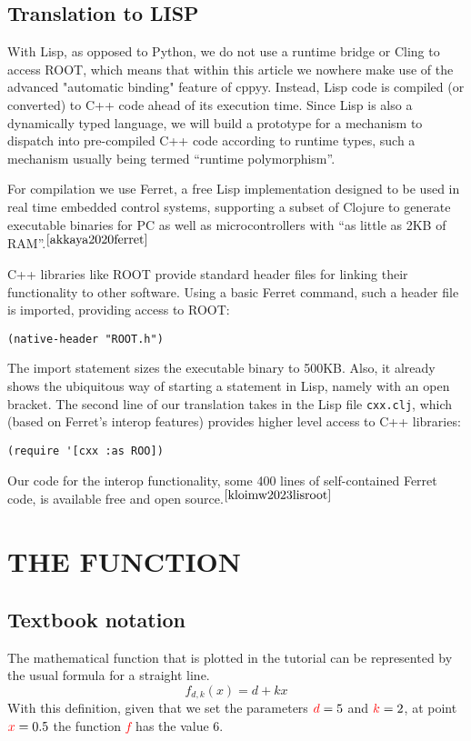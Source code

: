 \documentclass[twocolumn]{article}
\begin{document}
\subsection{Translation to LISP}
With Lisp, as opposed to Python, we do not use a runtime bridge or Cling to access ROOT, which means that within this article we nowhere make use of the advanced "automatic binding" feature of cppyy. Instead, Lisp code is compiled (or converted) to C++ code ahead of its execution time. Since Lisp is also a dynamically typed language, we will build a prototype for a mechanism to dispatch into pre-compiled C++ code according to runtime types, such a mechanism usually being termed “runtime polymorphism”.

For compilation we use Ferret, a free Lisp implementation designed to be used in real time embedded control systems, supporting a subset of Clojure  to generate executable binaries for PC as well as microcontrollers with “as little as 2KB of RAM”.$^{\cite{akkaya2020ferret}}$

C++ libraries like ROOT provide standard header files for linking their functionality to other software. Using a basic Ferret command, such a header file is imported, providing access to ROOT:
{\color{blue}\begin{verbatim}
(native-header "ROOT.h")
\end{verbatim}}
The import statement sizes the executable binary to 500KB. Also, it already shows the ubiquitous way of starting a statement in Lisp, namely with an open bracket. The second line of our translation takes in the Lisp file \texttt{cxx.clj}, which (based on Ferret’s interop features) provides higher level access to C++ libraries:
{\color{blue}\begin{verbatim}
(require '[cxx :as ROO])
\end{verbatim}}
Our code for the interop functionality, some 400 lines of self-contained Ferret code, is available free and open source.$^{\cite{kloimw2023lisroot}}$

\section{THE FUNCTION}
\subsection{Textbook notation}
The mathematical function that is plotted in the tutorial can be represented by the usual formula for a straight line.
{\color{red}
\begin{equation}
f_{d,k}(x)=d+kx
\end{equation}}
With this definition, given that we set the parameters \(\textcolor{red}{d} = 5\) and \(\textcolor{red}{k} = 2\), at point \(\textcolor{red}{x} = 0.5\) the function \textcolor{red}{$f$} has the value 6.
\end{document}
